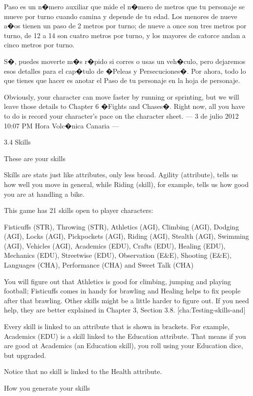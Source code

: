 Paso es un n�mero auxiliar que mide el n�mero de metros que tu personaje se mueve por turno cuando camina y depende de tu edad. Los menores de nueve a�os tienen un paso de 2 metros por turno; de nueve a once son tres metros por turno, de 12 a 14 son cuatro metros por turno, y los mayores de catorce andan a cinco metros por turno.


S�, puedes moverte m�s r�pido si corres o usas un veh�culo, pero dejaremos esos detalles para el cap�tulo de �Peleas y Persecuciones�. Por ahora, todo lo que tienes que hacer es anotar el Paso de tu personaje en la hoja de personaje.


Obviously, your character can move faster by running or sprinting, but we will leave those details to Chapter 6 �Fights and Chases�. Right now, all you have to do is record your character's pace on the character sheet.
--- 3 de julio 2012 10:07 PM Hora Volc�nica Canaria ---


3.4 Skills


These are your skills


Skills are stats just like attributes, only less broad. Agility (attribute), tells us how well you move in general, while Riding (skill), for example, tells us how good you are at handling a bike.


This game has 21 skills open to player characters:


Fisticuffs (STR), Throwing (STR), Athletics (AGI), Climbing (AGI), Dodging (AGI), Locks (AGI), Pickpockets (AGI), Riding (AGI), Stealth (AGI), Swimming (AGI), Vehicles (AGI), Academics (EDU), Crafts (EDU), Healing (EDU), Mechanics (EDU), Streetwise (EDU), Observation (E&E), Shooting (E&E), Languages (CHA), Performance (CHA) and Sweet Talk (CHA) 


You will figure out that Athletics is good for climbing, jumping and playing football; Fisticuffs comes in handy for brawling and Healing helps to fix people after that brawling. Other skills might be a little harder to figure out. If you need help, they are better explained in Chapter 3, Section 3.8. [cha:Testing-skills-and]


Every skill is linked to an attribute that is shown in brackets. For example, Academics (EDU) is a skill linked to the Education attribute. That means if you are good at Academics (an Education skill), you roll using your Education dice, but upgraded.


Notice that no skill is linked to the Health attribute.


How you generate your skills



